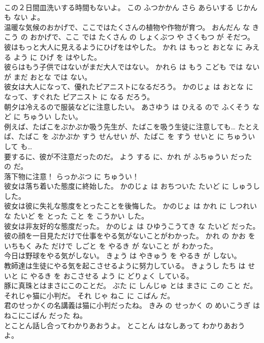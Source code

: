 \documentclass[8pt]{extreport}
\begin{document}
\begin{CJK}{UTF8}{min}
\\	この２日間皿洗いする時間もないよ。	この ふつかかん さら あらいする じかん も ない よ。	
\\	温暖な気候のおかげで、ここではたくさんの植物や作物が育つ。	おんだん な きこう の おかげで、ここ では たくさん の しょくぶつ や さくもつ が そだつ。	
\\	彼はもっと大人に見えるようにひげをはやした。	かれ は もっと おとな に みえる よう に ひげ を はやした。	
\\	彼らはもう子供ではないがまだ大人ではない。	かれら は もう こども では ない が まだ おとな では ない。	
\\	彼女は大人になって、優れたピアニストになるだろう。	かのじょ は おとな に なって、すぐれた ピアニスト に なる だろう。	
\\	朝夕は冷えるので服装などに注意したい。	あさゆう は ひえる ので ふくそう など に ちゅうい したい。	
\\	例えば、たばこをぷかぷか吸う先生が、たばこを吸う生徒に注意しても…	たとえば、たばこ を ぷかぷか すう せんせい が、たばこ を すう せいと に ちゅうい して も…	
\\	要するに、彼が不注意だったのだ。	よう する に、かれ が ふちゅうい だった の だ。	
\\	落下物に注意！	らっかぶつ に ちゅうい！	
\\	彼女は落ち着いた態度に終始した。	かのじょ は おちついた たいど に しゅうし した。	
\\	彼女は彼に失礼な態度をとったことを後悔した。	かのじょ は かれ に しつれい な たいど を とった こと を こうかい した。	
\\	彼女は非友好的な態度だった。	かのじょ は ひゆうこうてき な たいど だった。	
\\	彼の顔を一目見ただけで仕事をやる気がないことがわかった。	かれ の かお を いちもく みた だけで しごと を やるき が ないこと が わかった。	
\\	今日は野球をやる気がしない。	きょう は やきゅう を やるき が しない。	
\\	教師達は生徒にやる気を起こさせるように努力している。	きょうし たち は せいと に やるき を おこさせる よう に どりょく している。	
\\	豚に真珠とはまさにこのことだ。	ぶた に しんじゅ とは まさに この こと だ。	
\\	それじゃ猫に小判だ。	それ じゃ ねこ に こばん だ。	
\\	君のせっかくの名講義は猫に小判だったね。	きみ の せっかく の めいこうぎ は ねこにこばん だった ね。	
\\	とことん話し合ってわかりあおうよ。	とことん はなしあって わかりあおう よ。	

\end{CJK}
\end{document}
